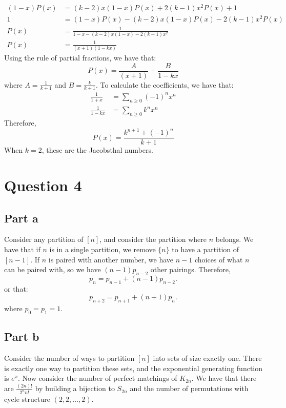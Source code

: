 \documentclass[]{article}
\begin{document}
\begin{align*}
	(1-x)P(x) &= (k-2) x(1-x) P(x)  + 2(k-1) x^2 P(x)+ 1 \\
	1 &=(1-x)P(x) - (k-2)x(1-x) P(x) - 2(k-1) x^2 P(x)\\
	P(x) &= \frac{1}{1-x - (k-2)x (1-x) - 2 (k-1) x^2}\\
	P(x) &= \frac{1}{(x + 1)(1 - kx)}
\end{align*}
Using the rule of partial fractions, we have that:
\begin{equation}
	P(x) = \frac{A}{(x + 1)} + \frac{B}{1-kx}
\end{equation}
where $A = \frac{1}{k + 1}$ and $B = \frac{k}{k+1}$.
To calculate the coefficients, we have that:
\begin{align*}
	\frac{1}{1 + x} &= \sum_{n \geq 0} (-1)^n x^n\\
	\frac{1}{1-kx} &= \sum_{n \geq 0} k^n x^n
\end{align*}
Therefore, 
\begin{equation}
	[x^n]P(x) = \frac{k^{n + 1} + (-1)^n}{k + 1}
\end{equation}
When $k = 2$, these are the Jacobsthal numbers. 
\newpage
\section{Question 4}
\subsection{Part a}
Consider any partition of $[n]$, and consider the partition where $n$ belongs. We have that if $n$ is in a single partition, we remove $\lbrace n \rbrace$ to have a partition of $[n-1]$. If $n$ is paired with another number, we have $n-1$ choices of what $n$ can be paired with, so we have $(n-1) p_{n-2}$ other pairings. Therefore,
\begin{equation}
	p_n = p_{n-1} + (n-1) p_{n-2}.
\end{equation}
or that:
\begin{equation}\label{eqn:recurrence}
	p_{n + 2} = p_{n+1} + (n+1) p_{n}.
\end{equation}
where $p_0 = p_1 = 1$. 

\subsection{Part b}
Consider the number of ways to partition $[n]$ into sets of size exactly one. There is exactly one way to partition these sets, and the exponential generating function is $e^x$.
Now consider the number of perfect matchings of $K_{2n}$. We have that there are $\frac{(2n)!}{2^n n!}$ by building a bijection to $S_{2n}$ and the number of permutations with cycle structure $(2,2, ..., 2)$. 
\end{document}

